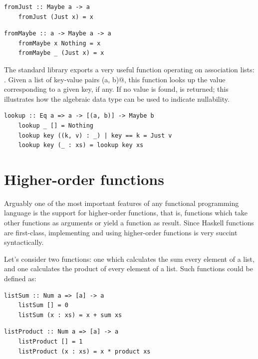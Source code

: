 \documentclass[UdineBachThesis,american,11pt,draft]{PhdThesis}
\begin{document}
  \begin{lstlisting}[gobble=4,basicstyle=\ttfamily\small]
    fromJust :: Maybe a -> a
    fromJust (Just x) = x
  \end{lstlisting}

  \begin{lstlisting}[gobble=4,basicstyle=\ttfamily\small]
    fromMaybe :: a -> Maybe a -> a
    fromMaybe x Nothing = x
    fromMaybe _ (Just x) = x
  \end{lstlisting}

  The standard library exports a very useful function operating on association
  lists: \lstinline@lookup@. Given a list of key-value pairs \lstinline@(a, b)@,
  this function looks up the value corresponding to a given key, if any. If no
  value is found, \lstinline@Nothing@ is returned; this illustrates how the
  algebraic data type \lstinline@Maybe@ can be used to indicate nullability.

  \begin{lstlisting}[gobble=4,basicstyle=\ttfamily\small]
    lookup :: Eq a => a -> [(a, b)] -> Maybe b
    lookup _ [] = Nothing
    lookup key ((k, v) : _) | key == k = Just v
    lookup key (_ : xs) = lookup key xs
  \end{lstlisting}

  \section{Higher-order functions}

  Arguably one of the most important features of any functional programming
  language is the support for higher-order functions, that is, functions which
  take other functions as arguments or yield a function as result. Since Haskell
  functions are first-class, implementing and using higher-order functions is
  very succint syntactically.

  Let's consider two functions: one which calculates the sum every element of a
  list, and one calculates the product of every element of a list. Such
  functions could be defined as:

  \begin{lstlisting}[gobble=4,basicstyle=\ttfamily\small]
    listSum :: Num a => [a] -> a
    listSum [] = 0
    listSum (x : xs) = x + sum xs
  \end{lstlisting}

  \begin{lstlisting}[gobble=4,basicstyle=\ttfamily\small]
    listProduct :: Num a => [a] -> a
    listProduct [] = 1
    listProduct (x : xs) = x * product xs
  \end{lstlisting}
\end{document}
